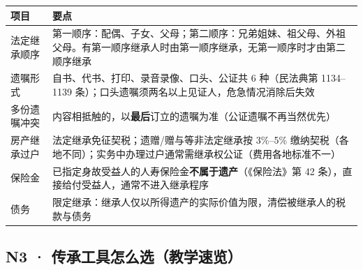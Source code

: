 \documentclass[a4paper,11pt,oneside,fontset=none,UTF8,zihao=-4]{ctexbook}
\begin{document}
\begin{longtable}[]{@{}
  >{\raggedright\arraybackslash}p{}
  >{\raggedright\arraybackslash}p{}@{}}
\toprule\noalign{}\rowcolor{dh-pink!25}
\begin{minipage}[b]{\linewidth}\raggedright
项目
\end{minipage} & \begin{minipage}[b]{\linewidth}\raggedright
要点
\end{minipage} \\
\midrule\noalign{}
\endhead
\bottomrule\noalign{}
\endlastfoot
法定继承顺序 &
第一顺序：配偶、子女、父母；第二顺序：兄弟姐妹、祖父母、外祖父母。有第一顺序继承人时由第一顺序继承，无第一顺序时才由第二顺序继承 \\
遗嘱形式 & 自书、代书、打印、录音录像、口头、公证共 6 种（民法典第
1134--1139 条）；口头遗嘱须两名以上见证人，危急情况消除后失效 \\
多份遗嘱冲突 &
内容相抵触的，以\textbf{最后}订立的遗嘱为准（公证遗嘱不再当然优先） \\
房产继承过户 & 法定继承免征契税；遗赠/赠与等非法定继承按 3\%--5\%
缴纳契税（各地不同）；实务中办理过户通常需继承权公证（费用各地标准不一） \\
保险金 & 已指定身故受益人的人寿保险金\textbf{不属于遗产}（《保险法》第
42 条），直接给付受益人，通常不进入继承程序 \\
债务 &
限定继承：继承人仅以所得遗产的实际价值为限，清偿被继承人的税款与债务 \\
\end{longtable}

\subsection{N3 ·
传承工具怎么选（教学速览）}\label{n3-ux4f20ux627fux5de5ux5177ux600eux4e48ux9009ux6559ux5b66ux901fux89c8}
\end{document}
